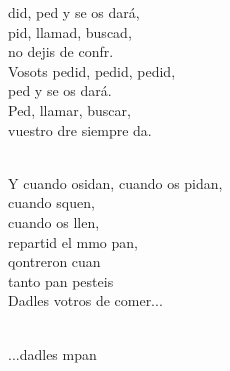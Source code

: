\documentclass[12pt]{article}
\begin{document}
\begin{multicols*}{2}
\begin{cancion}%
	did, ped y se os dará,\\
	pid, llamad, buscad,\\
	no dejis de confr.\\
	Vosots pedid, pedid, pedid, \\
	ped y se os dará.\\
	Ped, llamar, buscar, \\
	vuestro dre siempre da.\\\jump\\
	\begin{chorus}%
	Y cuando osidan, cuando os pidan,\\
	cuando squen,\\
	cuando os llen, \\
	repartid el mmo pan,\\
	qontreron cuan\\
	tanto pan pesteis\\
	Dadles votros de comer...\\
	\end{chorus}%
	\jump\\
	...dadles mpan\\
\end{cancion}%


\end{multicols*}
\end{document}
